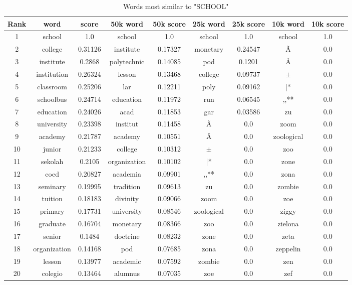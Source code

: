 \documentclass[10pt, a4paper, oneside]{article} %
\begin{document}
\begin{table}[!h]
\centering
\begin{tabular}{ | c | c | c | | c | c || c | c || c | c |}
\hline
Rank & word & score  & 50k word & 50k score & 25k word & 25k score & 10k word & 10k score\\ \hline
1 & school & 1.0 &school & 1.0 &school & 1.0 &school & 1.0 \\
2 & college & 0.31126 &institute & 0.17327 &monetary & 0.24547 &Ã & 0.0 \\
3 & institute & 0.2868 &polytechnic & 0.14085 &pod & 0.1201 &Â & 0.0 \\
4 & institution & 0.26324 &lesson & 0.13468 &college & 0.09737 &$\pm$ & 0.0 \\
5 & classroom & 0.25206 &lar & 0.12211 &poly & 0.09162 &|* & 0.0 \\
6 & schoolbus & 0.24714 &education & 0.11972 &run & 0.06545 &,,** & 0.0 \\
7 & education & 0.24026 &acad & 0.11853 &gar & 0.03586 &zu & 0.0 \\
8 & university & 0.23398 &institut & 0.11458 &Ã & 0.0 &zoom & 0.0 \\
9 & academy & 0.21787 &academy & 0.10551 &Â & 0.0 &zoological & 0.0 \\
10 & junior & 0.21233 &college & 0.10312 &$\pm$ & 0.0 &zoo & 0.0 \\
11 & sekolah & 0.2105 &organization & 0.10102 &|* & 0.0 &zone & 0.0 \\
12 & coed & 0.20827 &academia & 0.09901 &,,** & 0.0 &zona & 0.0 \\
13 & seminary & 0.19995 &tradition & 0.09613 &zu & 0.0 &zombie & 0.0 \\
14 & tuition & 0.18183 &divinity & 0.09066 &zoom & 0.0 &zoe & 0.0 \\
15 & primary & 0.17731 &university & 0.08546 &zoological & 0.0 &ziggy & 0.0 \\
16 & graduate & 0.16704 &monetary & 0.08366 &zoo & 0.0 &zielona & 0.0 \\
17 & senior & 0.1484 &doctrine & 0.08232 &zone & 0.0 &zeta & 0.0 \\
18 & organization & 0.14168 &pod & 0.07685 &zona & 0.0 &zeppelin & 0.0 \\
19 & lesson & 0.13977 &academic & 0.07592 &zombie & 0.0 &zen & 0.0 \\
20 & colegio & 0.13464 &alumnus & 0.07035 &zoe & 0.0 &zef & 0.0 \\
 \hline
\end{tabular}
\caption{Words most similar to "SCHOOL"}
\label{school}
\end{table}
\end{document}
